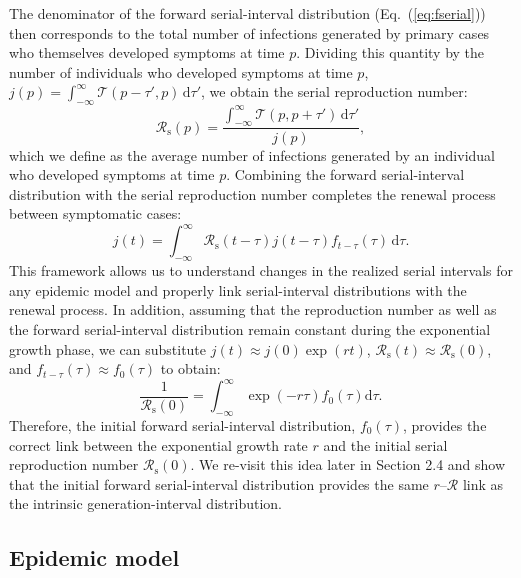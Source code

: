 \documentclass[12pt]{article}
\newcommand{\eref}[1]{Eq.~(\ref{eq:#1})}
\newcommand{\Rx}[1]{\ensuremath{{\mathcal R}_{#1}}\xspace}
\newcommand{\Rs}{\Rx{\mathrm{s}}}
\newcommand{\RR}{\ensuremath{{\mathcal R}}\xspace}
\newcommand{\dd}[1]{\ensuremath{\, \mathrm{d}#1}}
\newcommand{\dtau}{\dd{\tau}}
\newcommand{\psymp}{\ensuremath{p}} %
\newcommand{\total}{{\mathcal T}} %
\begin{document}
The denominator of the forward serial-interval distribution (\eref{fserial}) then corresponds to the total number of infections generated by primary cases who themselves developed symptoms at time \psymp.
Dividing this quantity by the number of individuals who developed symptoms at time \psymp, $j(\psymp) = \int_{-\infty}^\infty \total(\psymp-\tau', \psymp) \dtau'$, we obtain the serial reproduction number:
\begin{equation}
\Rs(\psymp) = \frac{\int_{-\infty}^\infty \total(\psymp, \psymp+\tau') \dtau'}{j(\psymp)},
\end{equation}
which we define as the average number of infections generated by an individual who developed symptoms at time \psymp.
Combining the forward serial-interval distribution with the serial reproduction number completes the renewal process between symptomatic cases:
\begin{equation}
j(t) = \int_{-\infty}^\infty \Rs(t-\tau) j(t-\tau) f_{t-\tau}(\tau) \dtau.
\label{eq:jrenew}
\end{equation}
This framework allows us to understand changes in the realized serial intervals for any epidemic model and properly link serial-interval distributions with the renewal process.
In addition,  assuming that the reproduction number as well as the forward serial-interval distribution remain constant during the exponential growth phase, we can substitute $j(t) \approx j(0) \exp(rt)$, $\Rs(t) \approx \Rs(0)$, and $f_{t-\tau}(\tau) \approx f_0(\tau)$ to obtain:
\begin{equation}
\frac{1}{\Rs(0)} = \int_{-\infty}^\infty \exp(-r\tau) f_{0}(\tau) \mathrm{d} \tau.
\label{eq:Rforward0}
\end{equation}
Therefore, the initial forward serial-interval distribution, $f_0(\tau)$, provides the correct link between the exponential growth rate $r$ and the initial serial reproduction number $\Rs(0)$.
We re-visit this idea later in Section 2.4 and show that the initial forward serial-interval distribution provides the same $r$--\RR link as the intrinsic generation-interval distribution.

\subsection{Epidemic model}
\end{document}
